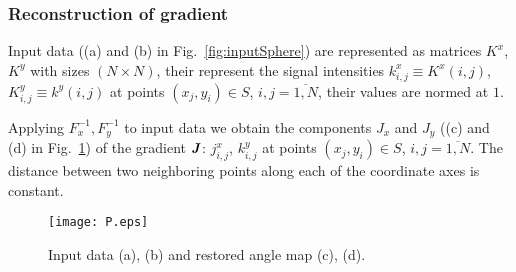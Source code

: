 \documentclass{beamer}
\begin{document}
\begin{frame}[c,allowframebreaks]
    \frametitle{Reconstruction of gradient}

    Input data ((a) and (b) in Fig.~\ref{fig:inputSphere}) are represented as matrices $K^x$, $K^y$
    with sizes $(N \times N)$, their represent the signal intensities $k^x_{i,j} \equiv K^x (i,j)$,
    $K^y_{i,j} \equiv k^y (i,j)$ at points $(x_j, y_i) \in S$, $i,j = \overline{1,N}$, their values
    are normed at $1$.

    Applying $F_x^{-1}, F_y^{-1}$ to input data we obtain the components $J_x$ and $J_y$
    ((c) and (d) in Fig.~\ref{fig:input_data}) of the gradient ${\textbf{\emph{J}}}$: $j^x_{i,j}$,
    $k^y_{i,j}$ at points $(x_j, y_i) \in S$, $i,j = \overline{1,N}$. The distance between two
    neighboring points along each of the coordinate axes is constant.

    \framebreak

    \begin{figure}
        \texttt{[image: P.eps]}
        \caption{Input data (a), (b) and restored angle map (c), (d).}
        {\label{fig:input_data}}%
    \end{figure}

\end{frame}





\end{document}
